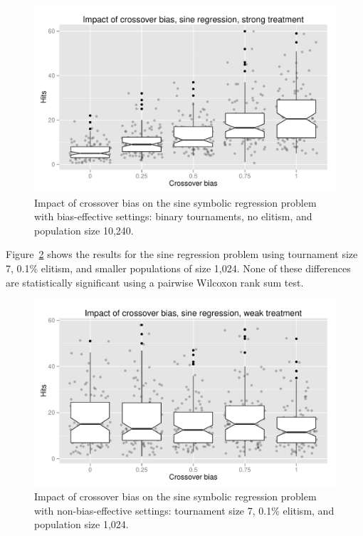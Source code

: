 \documentclass{sig-alternate}
\begin{document}
\begin{figure}
\centering
\includegraphics[width=0.45 \textwidth]{Plots/Sine_XO_impact_strong_boxplot.pdf}
\caption{Impact of crossover bias on the sine symbolic regression problem with bias-effective settings: binary
tournaments, no elitism, and population size 10,240.}
\label{fig:sineBiasResultsStrong}
\end{figure}

%
%
%
%

%
%
%
%

Figure~\ref{fig:sineBiasResultsWeak} shows the results for the sine regression problem using tournament size 7, 0.1\%
elitism, and smaller populations  of size 1,024. None of these differences are statistically significant using a
pairwise Wilcoxon rank sum test.

\begin{figure}
\centering
\includegraphics[width=0.45 \textwidth]{Plots/Sine_XO_impact_weak_boxplot.pdf}
\caption{Impact of crossover bias on the sine symbolic regression problem with non-bias-effective settings: tournament
size 7, 0.1\% elitism, and population size 1,024.}
\label{fig:sineBiasResultsWeak}
\end{figure}
\end{document}
